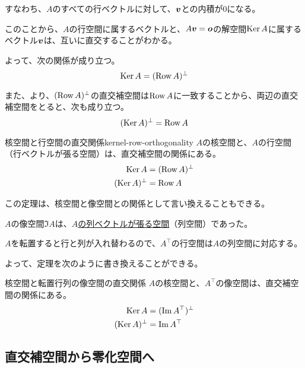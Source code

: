 \documentclass[../../../topic_linear-algebra]{subfiles}
\begin{document}
すなわち、$A$のすべての行ベクトルに対して、$\vb*{v}$との内積が0になる。

\br

このことから、$A$の行空間に属するベクトルと、$A\vb*{v} = \vb*{o}$の解空間$\operatorname{Ker} A$に属するベクトル$\vb*{v}$は、互いに直交することがわかる。

よって、次の関係が成り立つ。
\begin{equation*}
  \operatorname{Ker} A = (\operatorname{Row} A)^\perp
\end{equation*}

また、より、$(\operatorname{Row} A)^\perp$の直交補空間は$\operatorname{Row} A$に一致することから、両辺の直交補空間をとると、次も成り立つ。
\begin{equation*}
  (\operatorname{Ker} A)^\perp = \operatorname{Row} A
\end{equation*}

\begin{theorem}{核空間と行空間の直交関係}{kernel-row-orthogonality}
  $A$の核空間と、$A$の行空間（行ベクトルが張る空間）は、直交補空間の関係にある。
  \begin{align*}
    \operatorname{Ker} A &= (\operatorname{Row} A)^\perp \\
    (\operatorname{Ker} A)^\perp &= \operatorname{Row} A
  \end{align*}
\end{theorem}

この定理は、核空間と像空間との関係として言い換えることもできる。

\br

$A$の像空間$\Im A$は、\hyperref[sec:image-and-column-space]{$A$の列ベクトルが張る空間}（列空間）であった。

$A$を転置すると行と列が入れ替わるので、$A^\top$の行空間は$A$の列空間に対応する。

\br

よって、定理を次のように書き換えることができる。

\begin{theorem*}{核空間と転置行列の像空間の直交関係}
  $A$の核空間と、$A^\top$の像空間は、直交補空間の関係にある。
  \begin{align*}
    \operatorname{Ker} A &= (\Im A^\top)^\perp \\
    (\operatorname{Ker} A)^\perp &= \Im A^\top
  \end{align*}
\end{theorem*}

\subsection{直交補空間から零化空間へ}
\end{document}

